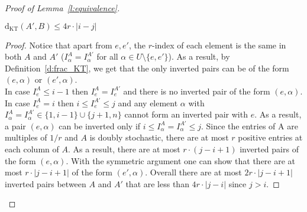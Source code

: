 \begin{proof}[Proof of Lemma~\ref{l:equivalence}]
    \begin{claim}
        $\mathrm{d}_{\mathrm{KT}}( A', B ) \leq 4r \cdot | i - j|$
    \end{claim}
    
    \begin{proof}
        \noindent Notice that apart from $e,e'$, the $r$-index of each element is the same in both $A$ and $A'$ ($I_\alpha^{A} = I_\alpha^{A'}$ for all $\alpha \in U \setminus \{e, e'\}$). As a result, by Definition~\ref{d:frac_KT}, we get that the only inverted pairs can be of the form $(e,\alpha)$ or $(e',\alpha)$.\\
    
        \noindent In case $I_e^A \leq i-1$ then $I_e^A = I_e^{A'}$ and there is no inverted pair of the form $(e,\alpha)$. In case $I_e^A = i$ then $i \leq I_e^{A'} \leq j$ and any element $\alpha$ with $I_\alpha^A =
        I_\alpha^{A'} \in \{1,i-1\}\cup \{j+1,n\}$ cannot form an inverted pair with $e$. As a result, a pair $(e,\alpha)$ can be inverted only if $i \leq I_\alpha^A = I_\alpha^{A'} \leq j$. Since the entries of A are multiples of $1/r$ and $A$ is doubly stochastic, there are at most
        $r$ positive entries at each column of $A$. As a result, there are at most $r \cdot (j-i+1)$ inverted pairs of the form $(e,\alpha)$. With the symmetric argument one can show that there are at most $r\cdot |j-i+1|$ of the form $(e',\alpha)$. Overall there are at most $2r\cdot |j-i+1|$ inverted pairs between $A$ and $A'$ that are less than $4r\cdot |j-i|$ since $j > i$.
    \end{proof}
    \end{proof}

